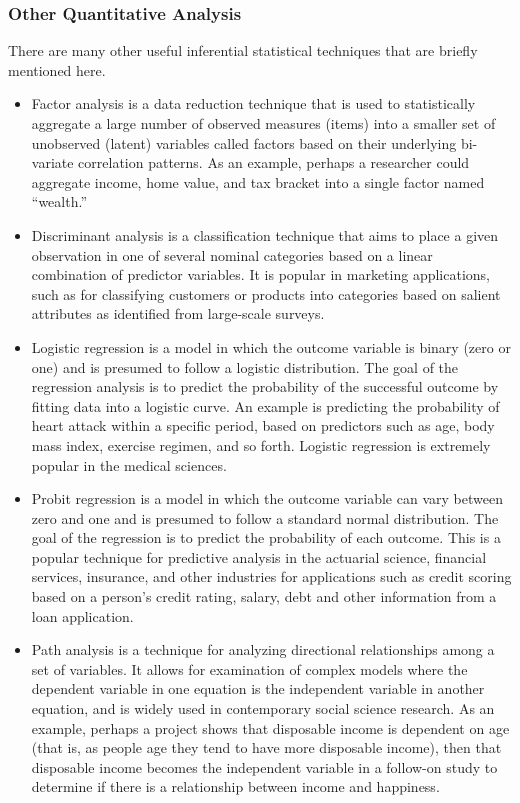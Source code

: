 \subsubsection{Other Quantitative Analysis}

There are many other useful inferential statistical techniques that are briefly mentioned here.

\begin{itemize}
	\item Factor analysis is a data reduction technique that is used to statistically aggregate a large number of observed measures (items) into a smaller set of unobserved (latent) variables called factors based on their underlying bi-variate correlation patterns. As an example, perhaps a researcher could aggregate income, home value, and tax bracket into a single factor named ``wealth.''
	\item Discriminant analysis is a classification technique that aims to place a given observation in one of several nominal categories based on a linear combination of predictor variables. It is popular in marketing applications, such as for classifying customers or products into categories based on salient attributes as identified from large-scale surveys.
	\item Logistic regression is a model in which the outcome variable is binary (zero or one) and is presumed to follow a logistic distribution. The goal of the regression analysis is to predict the probability of the successful outcome by fitting data into a logistic curve. An example is predicting the probability of heart attack within a specific period, based on predictors such as age, body mass index, exercise regimen, and so forth. Logistic regression is extremely popular in the medical sciences. 
	\item Probit regression is a model in which the outcome variable can vary between zero and one and is presumed to follow a standard normal distribution. The goal of the regression is to predict the probability of each outcome. This is a popular technique for predictive analysis in the actuarial science, financial services, insurance, and other industries for applications such as credit scoring based on a person's credit rating, salary, debt and other information from a loan application.
	\item Path analysis is a technique for analyzing directional relationships among a set of variables. It allows for examination of complex models where the dependent variable in one equation is the independent variable in another equation, and is widely used in contemporary social science research. As an example, perhaps a project shows that disposable income is dependent on age (that is, as people age they tend to have more disposable income), then that disposable income becomes the independent variable in a follow-on study to determine if there is a relationship between income and happiness.

\end{itemize}

